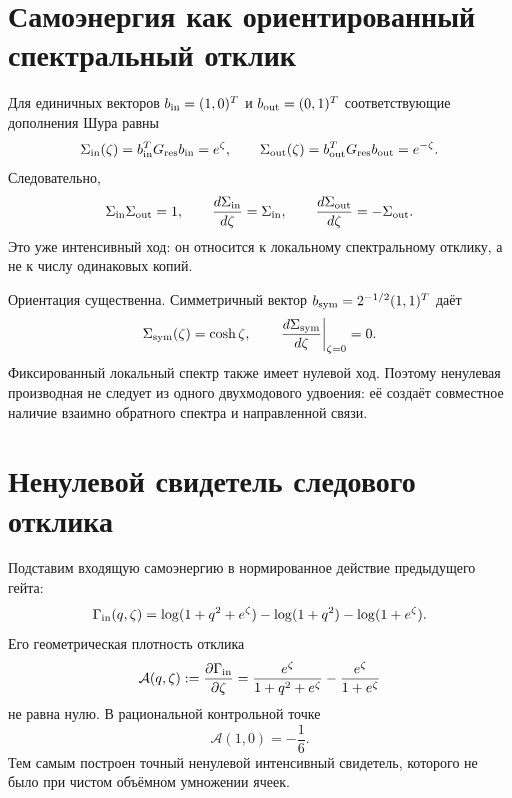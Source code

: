 \section{Самоэнергия как ориентированный спектральный отклик}

Для единичных векторов $b_{\rm in}=(1,0)^T$ и
$b_{\rm out}=(0,1)^T$ соответствующие дополнения Шура равны
\begin{equation}
 \Sigma_{\rm in}(\zeta)
 =b_{\rm in}^{T}G_{\rm res}b_{\rm in}=e^{\zeta},
 \qquad
 \Sigma_{\rm out}(\zeta)
 =b_{\rm out}^{T}G_{\rm res}b_{\rm out}=e^{-\zeta}.
 \label{eq:v10-oriented-self-energies}
\end{equation}
Следовательно,
\begin{equation}
 \Sigma_{\rm in}\Sigma_{\rm out}=1,
 \qquad
 \frac{d\Sigma_{\rm in}}{d\zeta}=\Sigma_{\rm in},
 \qquad
 \frac{d\Sigma_{\rm out}}{d\zeta}=-\Sigma_{\rm out}.
 \label{eq:v10-oriented-self-energy-beta}
\end{equation}
Это уже интенсивный ход: он относится к локальному спектральному отклику,
а не к числу одинаковых копий.

Ориентация существенна. Симметричный вектор
$b_{\rm sym}=2^{-1/2}(1,1)^T$ даёт
\begin{equation}
 \Sigma_{\rm sym}(\zeta)=\cosh\zeta,
 \qquad
 \left.\frac{d\Sigma_{\rm sym}}{d\zeta}\right|_{\zeta=0}=0.
 \label{eq:v10-symmetric-self-energy-zero-beta}
\end{equation}
Фиксированный локальный спектр также имеет нулевой ход. Поэтому ненулевая
производная не следует из одного двухмодового удвоения: её создаёт совместное
наличие взаимно обратного спектра и направленной связи.

\section{Ненулевой свидетель следового отклика}

Подставим входящую самоэнергию в нормированное действие предыдущего гейта:
\begin{equation}
 \Gamma_{\rm in}(q,\zeta)
 =\log(1+q^2+e^{\zeta})
  -\log(1+q^2)-\log(1+e^{\zeta}).
 \label{eq:v10-running-inflow-action}
\end{equation}
Его геометрическая плотность отклика
\begin{equation}
 \mathcal A(q,\zeta)
 :=\frac{\partial\Gamma_{\rm in}}{\partial\zeta}
 =\frac{e^{\zeta}}{1+q^2+e^{\zeta}}
  -\frac{e^{\zeta}}{1+e^{\zeta}}
 \label{eq:v10-running-trace-response}
\end{equation}
не равна нулю. В рациональной контрольной точке
\begin{equation}
 \mathcal A(1,0)=-\frac16.
 \label{eq:v10-running-trace-response-witness}
\end{equation}
Тем самым построен точный ненулевой интенсивный свидетель, которого не было
при чистом объёмном умножении ячеек.

